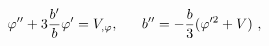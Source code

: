 \begin{equation}\label{equations}
\varphi''+3{b'\over b}\varphi'=V_{,\varphi},~~~~~ b''= -{b\over 3}  (\varphi'^2 +V) \ ,
 \end{equation}


